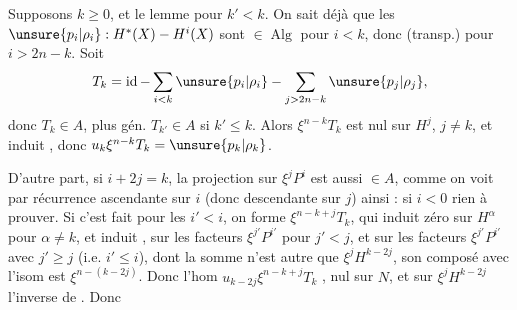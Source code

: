 
Supposons $k\geq0$, et le lemme  pour $k'<k$. On sait déjà que les $\unsure{p_i|\rho_i}:H^*(X)\mathbin{-}H^i(X)$ sont $\in\operatorname{Alg}$ pour $i<k$, donc (transp.) pour $i>2n-k$. Soit
\[
T_k=\operatorname{id}-\sum_{i<k}\unsure{p_i|\rho_i}-\sum_{j>2n-k}\unsure{p_j|\rho_j},
\]
donc $T_k\in A$, plus gén. $T_{k'}\in A$ si $k'\leq k$. Alors $\xi^{n-k}T_k$ est nul sur $H^j$, $j\neq k$, et induit
, donc $u_k\xi^{n-k}T_k=\unsure{p_k|\rho_k}$.

D'autre part, si $i+2j=k$,  la projection sur $\xi^jP^i$ est aussi $\in A$, comme on voit  par récurrence ascendante sur $i$ (donc descendante sur $j$) ainsi : si $i<0$ rien à prouver. Si c'est fait pour les $i'<i$, on forme $\xi^{n-k+j}T_k$, \deleted{$\unsure{\xi}$} qui induit zéro sur $H^\alpha$ pour $\alpha\neq k$, et induit
,   sur les facteurs $\xi^{j'}P^{i'}$ pour $j'<j$,  et sur les facteurs $\xi^{j'}P^{i'}$ avec $j'\geq j$ (i.e. $i'\leq i$),  dont la somme n'est autre que $\xi^jH^{k-2j}$, son composé avec l'isom
est $\xi^{n-(k-2j)}$. Donc l'hom $u_{k-2j}\xi^{n-k+j}T_k$ , nul sur $N$, et sur $\xi^jH^{k-2j}$ l'inverse de
. Donc

